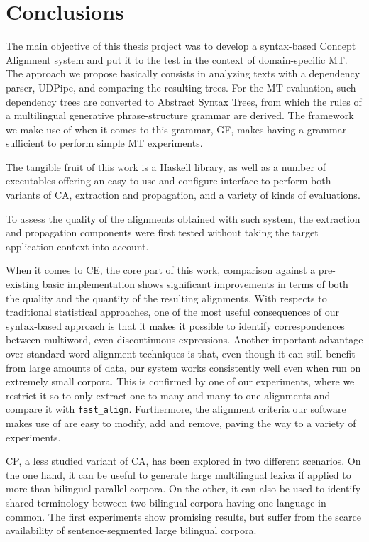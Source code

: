\chapter{Conclusions} \label{ch6}

The main objective of this thesis project was to develop a syntax-based Concept Alignment system and put it to the test in the context of domain-specific MT. The approach we propose basically consists in analyzing texts with a dependency parser, UDPipe, and comparing the resulting trees. For the MT evaluation, such dependency trees are converted to Abstract Syntax Trees, from which the rules of a multilingual generative phrase-structure grammar are derived. The framework we make use of when it comes to this grammar, GF, makes having a grammar sufficient to perform simple MT experiments.\smallskip

The tangible fruit of this work is a Haskell library, as well as a number of executables offering an easy to use and configure interface to perform both variants of CA, extraction and propagation, and a variety of kinds of evaluations. \smallskip

To assess the quality of the alignments obtained with such system, the extraction and propagation components were first tested without taking the target application context into account. \smallskip

When it comes to CE, the core part of this work, comparison against a pre-existing basic implementation shows significant improvements in terms of both the quality and the quantity of the resulting alignments. 
With respects to traditional statistical approaches, one of the most useful consequences of our syntax-based approach is that it makes it possible to identify correspondences between multiword, even discontinuous expressions. 
Another important advantage over standard word alignment techniques is that, even though it can still benefit from large amounts of data, our system works consistently well even when run on extremely small corpora. This is confirmed by one of our experiments, where we restrict it so to only extract one-to-many and many-to-one alignments and compare it with \texttt{fast\_align}. 
Furthermore, the alignment criteria our software makes use of are easy to modify, add and remove, paving the way to a variety of experiments. \smallskip

CP, a less studied variant of CA, has been explored in two different scenarios. On the one hand, it can be useful to generate large multilingual lexica if applied to more-than-bilingual parallel corpora. On the other, it can also be used to identify shared terminology between two bilingual corpora having one language in common. The first experiments show promising results, but suffer from the scarce availability of sentence-segmented large bilingual corpora. \smallskip

